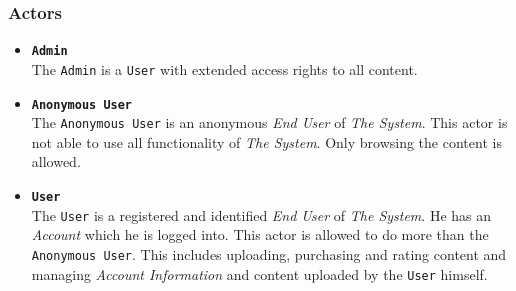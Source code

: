 %

\subsubsection{Actors}
\label{sec:Actors}
\begin{itemize}
\item \texttt{\textbf{Admin}} \\
The \texttt{Admin} is a \texttt{User} with extended access rights to all content. 
\item \texttt{\textbf{Anonymous User}}\\ 
The \texttt{Anonymous User} is an anonymous \textit{End User} of \textit{The System}. This actor is not able to use all functionality of \textit{The System}. Only browsing the content is allowed.
\item \texttt{\textbf{User}} \\
The \texttt{User} is a registered and identified \textit{End User} of \textit{The System}. He has an \textit{Account} which he is logged into. This actor is allowed to do more than the \texttt{Anonymous User}. This includes uploading, purchasing and rating content and managing \textit{Account Information} and content uploaded by the \texttt{User} himself.
\end{itemize}

